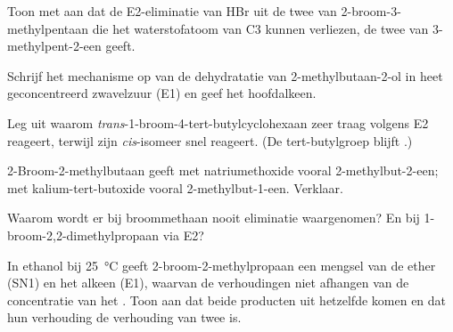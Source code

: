 \begin{exercise}[$\star\star$]\label{exo:b1:elimination:5}
Toon met  aan dat de E2-eliminatie van HBr uit de twee
 van 2-broom-3-methylpentaan die het waterstofatoom van C3
kunnen verliezen, de twee  van 3-methylpent-2-een geeft.
\end{exercise}

\begin{exercise}[$\star\star$]\label{exo:b1:elimination:6}
Schrijf het mechanisme op van de dehydratatie van 2-methylbutaan-2-ol in
heet geconcentreerd zwavelzuur (E1) en geef het hoofdalkeen.
\end{exercise}

\begin{exercise}[$\star\star$]\label{exo:b1:elimination:7}
Leg uit waarom \textit{trans}-1-broom-4-tert-butylcyclohexaan zeer traag
volgens E2 reageert, terwijl zijn \textit{cis}-isomeer snel reageert. (De
tert-butylgroep blijft .)
\end{exercise}

\begin{exercise}[$\star\star$]\label{exo:b1:elimination:8}
2-Broom-2-methylbutaan geeft met natriumethoxide vooral
2-methylbut-2-een; met kalium-tert-butoxide vooral 2-methylbut-1-een.
Verklaar.
\end{exercise}

\begin{exercise}[$\star\star$]\label{exo:b1:elimination:9}
Waarom wordt er bij broommethaan nooit eliminatie waargenomen? En bij
1-broom-2,2-dimethylpropaan via E2?
\end{exercise}

\begin{exercise}[$\star\star\star$]\label{exo:b1:elimination:10}
In ethanol bij \qty{25}{\celsius} geeft 2-broom-2-methylpropaan een
mengsel van de ether (SN1) en het alkeen (E1), waarvan de verhoudingen
niet afhangen van de concentratie van het . Toon aan dat beide
producten uit hetzelfde  komen en dat hun verhouding de
verhouding van twee  is.
\end{exercise}

